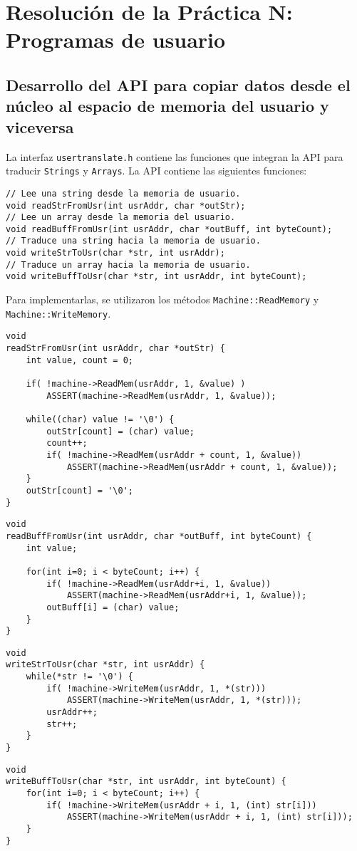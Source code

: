 \chapter{Resolución de la Práctica N: Programas de usuario}
\section{Desarrollo del API para copiar datos desde el núcleo al espacio de memoria del usuario y viceversa}
La interfaz \texttt{usertranslate.h} contiene las funciones que integran la API para traducir \texttt{Strings} y \texttt{Arrays}. La API contiene las siguientes funciones:
\begin{lstlisting}[style=C]
// Lee una string desde la memoria de usuario.
void readStrFromUsr(int usrAddr, char *outStr);
// Lee un array desde la memoria del usuario.
void readBuffFromUsr(int usrAddr, char *outBuff, int byteCount);
// Traduce una string hacia la memoria de usuario.
void writeStrToUsr(char *str, int usrAddr);
// Traduce un array hacia la memoria de usuario.
void writeBuffToUsr(char *str, int usrAddr, int byteCount);
\end{lstlisting}
Para implementarlas, se utilizaron los métodos \texttt{Machine::ReadMemory} y \texttt{Machine::WriteMemory}.
\begin{lstlisting}[style=C]
void
readStrFromUsr(int usrAddr, char *outStr) {
    int value, count = 0;
   
    if( !machine->ReadMem(usrAddr, 1, &value) )
        ASSERT(machine->ReadMem(usrAddr, 1, &value));
        
    while((char) value != '\0') {
        outStr[count] = (char) value;
        count++;
        if( !machine->ReadMem(usrAddr + count, 1, &value))
            ASSERT(machine->ReadMem(usrAddr + count, 1, &value));
    }
    outStr[count] = '\0';
}
\end{lstlisting}
\begin{lstlisting}[style=C]
void
readBuffFromUsr(int usrAddr, char *outBuff, int byteCount) {
    int value;

    for(int i=0; i < byteCount; i++) {
        if( !machine->ReadMem(usrAddr+i, 1, &value))
            ASSERT(machine->ReadMem(usrAddr+i, 1, &value));
        outBuff[i] = (char) value;
    }
}
\end{lstlisting}
\begin{lstlisting}[style=C]
void
writeStrToUsr(char *str, int usrAddr) {
    while(*str != '\0') {
        if( !machine->WriteMem(usrAddr, 1, *(str)))
            ASSERT(machine->WriteMem(usrAddr, 1, *(str)));
        usrAddr++;
        str++;
    }
}
\end{lstlisting}
\begin{lstlisting}[style=C]
void
writeBuffToUsr(char *str, int usrAddr, int byteCount) {
    for(int i=0; i < byteCount; i++) {
        if( !machine->WriteMem(usrAddr + i, 1, (int) str[i]))
            ASSERT(machine->WriteMem(usrAddr + i, 1, (int) str[i]));
    }
}
\end{lstlisting}
